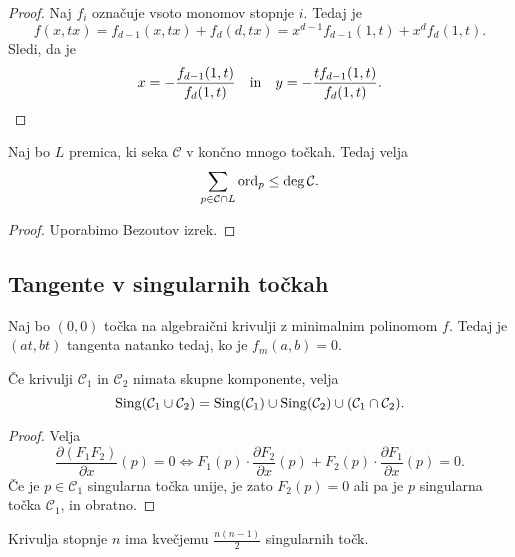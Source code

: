 \begin{proof}
Naj $f_i$ označuje vsoto monomov stopnje $i$. Tedaj je
\[
f(x, tx) =
f_{d-1}(x, tx) + f_d(d,tx) =
x^{d-1} f_{d-1}(1, t) + x^d f_d(1, t).
\]
Sledi, da je
\[
x = -\frac{f_{d-1}(1, t)}{f_d(1, t)}
\quad \text{in} \quad
y = -\frac{t f_{d-1}(1, t)}{f_d(1, t)}. \qedhere
\]
\end{proof}

\begin{posledica}
Naj bo $L$ premica, ki seka $\mathcal{C}$ v končno mnogo točkah.
Tedaj velja
\[
\sum_{p \in \mathcal{C} \cap L} \operatorname{ord}_p \leq \deg \mathcal{C}.
\]
\end{posledica}

\begin{proof}
Uporabimo Bezoutov izrek.
\end{proof}

\newpage

\subsection{Tangente v singularnih točkah}

\begin{trditev}
Naj bo $(0, 0)$ točka na algebraični krivulji z minimalnim
polinomom $f$. Tedaj je $(at, bt)$ tangenta natanko tedaj, ko je
$f_m(a,b) = 0$.
\end{trditev}

\obvs

\newpage


\begin{lema}
Če krivulji $\mathcal{C}_1$ in $\mathcal{C}_2$ nimata skupne
komponente, velja
\[
\operatorname{Sing}(\mathcal{C}_1 \cup \mathcal{C}_2) =
\operatorname{Sing}(\mathcal{C}_1) \cup \operatorname{Sing}(\mathcal{C}_2) \cup
(\mathcal{C}_1 \cap \mathcal{C}_2).
\]
\end{lema}

\begin{proof}
Velja
\[
\frac{\partial (F_1 F_2)}{\partial x}(p) = 0 \iff
F_1(p) \cdot \frac{\partial F_2}{\partial x}(p) +
F_2(p) \cdot \frac{\partial F_1}{\partial x}(p) = 0.
\]
Če je $p \in \mathcal{C}_1$ singularna točka unije, je zato
$F_2(p) = 0$ ali pa je $p$ singularna točka $\mathcal{C}_1$, in
obratno.
\end{proof}

\begin{posledica}
Krivulja stopnje $n$ ima kvečjemu $\frac{n(n-1)}{2}$ singularnih
točk.
\end{posledica}

